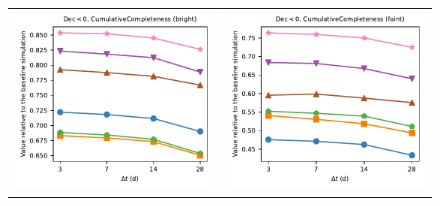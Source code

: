 \documentclass[preprintm,linenumbers]{aastex631}
\begin{document}
		\begin{figure}
			\centering
			\begin{tabular}{@{}c@{}c@{}}
    				\includegraphics{results/one_snap_v4_0_n_visits_4_Dec_lt_0_discovery_metric_bright.pdf} &
				\includegraphics{results/one_snap_v4_0_n_visits_4_Dec_lt_0_discovery_metric_faint.pdf} \\

\end{tabular}
\end{figure}
\end{document}
